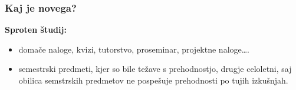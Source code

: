 \documentclass{beamer}
\begin{document}
\begin{frame}
\frametitle{Kaj je novega?}
{\bf \large{Sproten \v studij:}}
\begin{itemize}
\item doma\v ce naloge, kvizi, tutorstvo, proseminar, projektne naloge\ldots.\pause
\item semestrski predmeti, kjer so bile te\v zave s prehodnostjo, drugje celoletni, saj obilica semstrskih predmetov ne
pospe\v suje prehodnosti po tujih izku\v snjah.\pause
\end{itemize}
\begin{columns}
\begin{column}{5.4cm}
\end{column}
\begin{column}{5.4cm}
\end{column}
\end{columns}
\end{frame}
\end{document}
